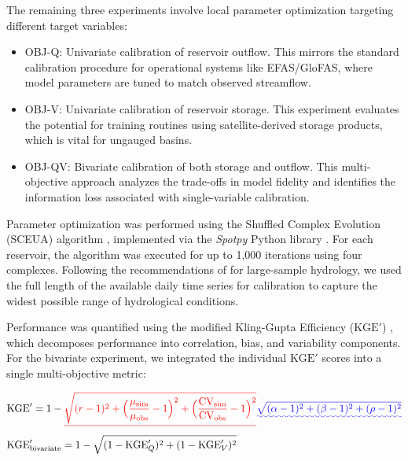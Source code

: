 \documentclass[hess, manuscript]{copernicus}
\newcommand{\calV}{OBJ-V}
\newcommand{\calQ}{OBJ-Q}
\newcommand{\calQV}{OBJ-QV}
\newcommand{\KGEmod}{$\text{KGE}'$} %
\providecommand{\DIFadd}[1]{{\protect\color{blue}\uwave{#1}}} %
\providecommand{\DIFdel}[1]{{\protect\color{red}\sout{#1}}}                      %
\providecommand{\DIFaddbegin}{} %
\providecommand{\DIFaddend}{} %
\providecommand{\DIFdelbegin}{} %
\providecommand{\DIFdelend}{} %
\begin{document}
The remaining three experiments involve local parameter optimization targeting different target variables:
\begin{itemize} 
    \item \calQ: Univariate calibration of reservoir outflow. This mirrors the standard calibration procedure for operational systems like EFAS/GloFAS, where model parameters are tuned to match observed streamflow. 
    \item \calV: Univariate calibration of reservoir storage. This experiment evaluates the potential for training routines using satellite-derived storage products, which is vital for ungauged basins. 
    \item \calQV: Bivariate calibration of both storage and outflow. This multi-objective approach analyzes the trade-offs in model fidelity and identifies the information loss associated with single-variable calibration. 
\end{itemize}

Parameter optimization was performed using the Shuffled Complex Evolution (SCEUA) algorithm \citep{Duan1993, Duan1994}, implemented via the \textit{Spotpy} Python library \citep{Houska2015}. For each reservoir, the algorithm was executed for up to 1,000 iterations using four complexes. Following the recommendations of \citet{Shen2024} for large-sample hydrology, we used the full length of the available daily time series for calibration to capture the widest possible range of hydrological conditions.

Performance was quantified using the modified Kling-Gupta Efficiency (\DIFdelbegin \DIFdel{$\text{KGE}'$}\DIFdelend \DIFaddbegin \DIFadd{\KGEmod}\DIFaddend ) \citep{kling2012}, which decomposes performance into correlation, bias, and variability components. For the bivariate experiment, we integrated the individual \DIFdelbegin \DIFdel{$\text{KGE}'$ }\DIFdelend \DIFaddbegin \DIFadd{\KGEmod\ }\DIFaddend scores into a single multi-objective metric:

{\small
\begin{subequations}
    \label{eq:metrics}
    \begin{align}
        &\text{KGE}' = 1 - \DIFdelbegin \DIFdel{\sqrt{(r - 1)^2 + \Bigl(\frac{\mu_{\text{sim}}}{\mu_{\text{obs}}} - 1\Bigr)^2 + \Bigl(\frac{\text{CV}_{\text{sim}}}{\text{CV}_{\text{obs}}} - 1\Bigr)^2} }\DIFdelend \DIFaddbegin \DIFadd{\sqrt{(\alpha - 1)^2+ (\beta - 1)^2 + (\rho - 1)^2 } }\DIFaddend \label{eq:kge} \\
        &\text{KGE}'_{\text{bivariate}} = 1 - \sqrt{(1 - \text{KGE}'_Q)^2 + (1 - \text{KGE}'_V)^2} \label{eq:kge_bivariate}
    \end{align}
\end{subequations}
}
\DIFdelbegin %
\end{document}
